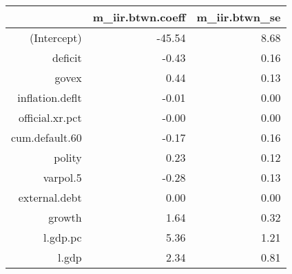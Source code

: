 \documentclass{article}
\begin{document}
\begin{table}[ht]
\centering
\begin{tabular}{rrr}
  \hline
 & m\_iir.btwn.coeff & m\_iir.btwn\_se \\
  \hline
(Intercept) & -45.54 & 8.68 \\
  deficit & -0.43 & 0.16 \\
  govex & 0.44 & 0.13 \\
  inflation.deflt & -0.01 & 0.00 \\
  official.xr.pct & -0.00 & 0.00 \\
  cum.default.60 & -0.17 & 0.16 \\
  polity & 0.23 & 0.12 \\
  varpol.5 & -0.28 & 0.13 \\
  external.debt & 0.00 & 0.00 \\
  growth & 1.64 & 0.32 \\
  l.gdp.pc & 5.36 & 1.21 \\
  l.gdp & 2.34 & 0.81 \\
   \hline
\end{tabular}
\end{table}
\end{document}
